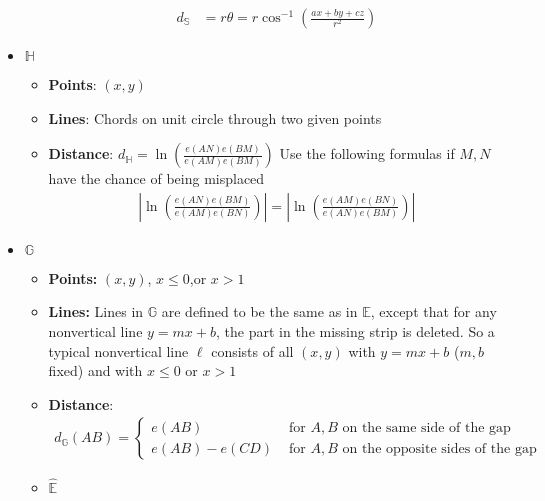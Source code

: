 \documentclass{report}
\begin{document}
\begin{itemize}
\begin{itemize}
                    \begin{align*}
                        d_{\mathbb{S}} &= r\theta = r\cos^{-1}{\left(\frac{ax+by+cz}{r^{2}}\right)}
                    \end{align*}
            \end{itemize}
        \item \textbf{$\mathbb{H}$}
            \begin{itemize}
                \item \textbf{Points}: $(x,y)$
                \item \textbf{Lines}: Chords on unit circle through two given points
                \item \textbf{Distance}: $d_{\mathbb{H}} = \ln{\left(\frac{e(AN)e(BM)}{e(AM)e(BM)}\right)}$
                    \bigbreak \noindent 
                    Use the following formulas if $M,N$ have the chance of being misplaced
                    \begin{align*}
                        \left\lvert \ln{\left(\frac{e(AN)e(BM)}{e(AM)e(BN)}\right)} \right\rvert = \left\lvert \ln{\left(\frac{e(AM)e(BN)}{e(AN)e(BM)}\right)} \right\rvert
                    \end{align*}
            \end{itemize}
        \item \textbf{$\mathbb{G}$}
            \begin{itemize}
                \item \textbf{Points:}   $(x,y)$, $x \leq 0$,or  $x > 1 $
                \item \textbf{Lines:} Lines in $\mathbb{G}$ are defined to be the same as in $\mathbb{E}$, except that for any nonvertical line $y=mx+b$, the part in the missing strip is deleted. So a typical nonvertical line $\ell$ consists of all $(x,y)$ with $y=mx+b$ ($m,b$ fixed) and with $x \leq 0$ or $x > 1$
                \item \textbf{Distance}: 
                    \begin{align*}
                        d_{\mathbb{G}}(AB) = \begin{cases}
                            e(AB) & \text{ for $A,B$ on the same side of the gap} \\     
                            e(AB) - e(CD) & \text{ for $A,B$ on the opposite sides of the gap} 
                        \end{cases}
                    \end{align*}
                \item \textbf{$\hat{\mathbb{E}}$}

\end{itemize}
\end{itemize}
\end{document}
